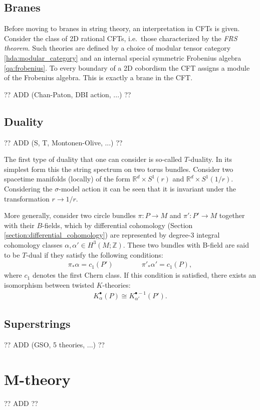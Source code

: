 \subsection{Branes}

    Before moving to branes in string theory, an interpretation in CFTs is given. Consider the class of 2D rational CFTs, i.e.~those characterized by the \textit{FRS theorem}. Such theories are defined by a choice of modular tensor category \ref{hda:modular_category} and an internal special symmetric Frobenius algebra \ref{qa:frobenius}. To every boundary of a 2D cobordism the CFT assigns a module of the Frobenius algebra. This is exactly a brane in the CFT.

    ?? ADD (Chan-Paton, DBI action, ...) ??

\subsection{Duality}

    ?? ADD (S, T, Montonen-Olive, ...) ??

    The first type of duality that one can consider is so-called $T$-duality. In its simplest form this the string spectrum on two torus bundles. Consider two spacetime manifolds (locally) of the form $\mathbb{R}^d\times S^1(r)$ and $\mathbb{R}^d\times S^1(1/r)$. Considering the $\sigma$-model action it can be seen that it is invariant under the transformation $r\longrightarrow 1/r$.

    More generally, consider two circle bundles $\pi:P\rightarrow M$ and $\pi':P'\rightarrow M$ together with their $B$-fields, which by differential cohomology (Section \ref{section:differential_cohomology}) are represented by degree-3 integral cohomology classes $\alpha,\alpha'\in H^3(M;\mathbb{Z})$. These two bundles with B-field are said to be $T$-dual if they satisfy the following conditions:
    \begin{gather}
        \pi_*\alpha=c_1(P')\qquad\qquad\pi'_*\alpha'=c_1(P),
    \end{gather}
    where $c_1$ denotes the first Chern class. If this condition is satisfied, there exists an isomorphism between twisted $K$-theories:
    \begin{gather}
        K^\bullet_\alpha(P)\cong K^{\bullet-1}_{\alpha'}(P').
    \end{gather}

\subsection{Superstrings}

    ?? ADD (GSO, 5 theories, ...) ??

\section{M-theory}

    ?? ADD ??